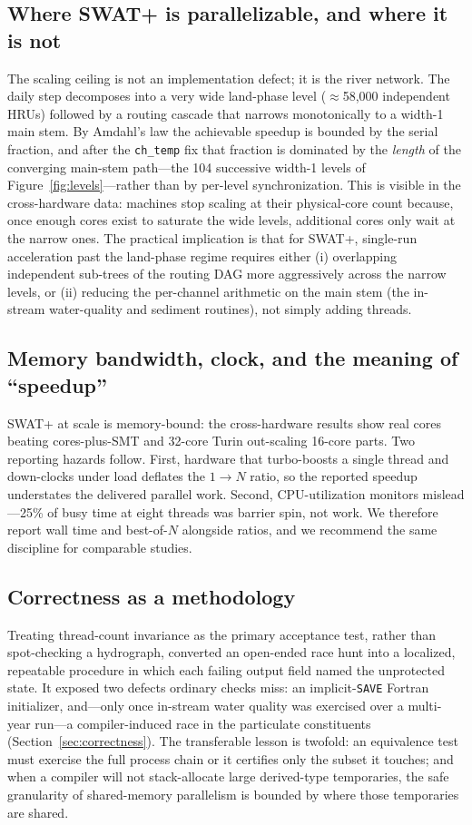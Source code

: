 \subsection{Where SWAT+ is parallelizable, and where it is not}
The scaling ceiling is not an implementation defect; it is the river network. The daily step
decomposes into a very wide land-phase level ($\approx$58{,}000 independent HRUs) followed by
a routing cascade that narrows monotonically to a width-1 main stem. By Amdahl's law
\citep{Amdahl1967} the achievable speedup is bounded by the serial fraction, and after the
\texttt{ch\_temp} fix that fraction is dominated by the \emph{length} of the converging
main-stem path---the 104 successive width-1 levels of Figure~\ref{fig:levels}---rather than by
per-level synchronization. This is visible in the cross-hardware
data: machines stop scaling at their physical-core count because, once enough cores exist to
saturate the wide levels, additional cores only wait at the narrow ones. The practical
implication is that for SWAT+, single-run acceleration past the land-phase regime requires
either (i) overlapping independent sub-trees of the routing DAG more aggressively across the
narrow levels, or (ii) reducing the per-channel arithmetic on the main stem (the in-stream
water-quality and sediment routines), not simply adding threads.

\subsection{Memory bandwidth, clock, and the meaning of ``speedup''}
SWAT+ at scale is memory-bound: the cross-hardware results show real cores beating
cores-plus-SMT and 32-core Turin out-scaling 16-core parts. Two reporting hazards follow.
First, hardware that turbo-boosts a single thread and down-clocks under load deflates the
$1\rightarrow N$ ratio, so the reported speedup understates the delivered parallel work. Second,
CPU-utilization monitors mislead---25\% of busy time at eight
threads was barrier spin, not work. We therefore report wall time and best-of-$N$ alongside
ratios, and we recommend the same discipline for comparable studies.

\subsection{Correctness as a methodology}
Treating thread-count invariance as the primary acceptance test, rather than spot-checking a
hydrograph, converted an open-ended race hunt into a localized, repeatable procedure in which each
failing output field named the unprotected state. It exposed two defects ordinary checks miss: an
implicit-\texttt{SAVE} Fortran initializer, and---only once in-stream water quality was exercised
over a multi-year run---a compiler-induced race in the particulate constituents
(Section~\ref{sec:correctness}). The transferable lesson is twofold: an equivalence test must
exercise the full process chain or it certifies only the subset it touches; and when a compiler will
not stack-allocate large derived-type temporaries, the safe granularity of shared-memory parallelism
is bounded by where those temporaries are shared.


